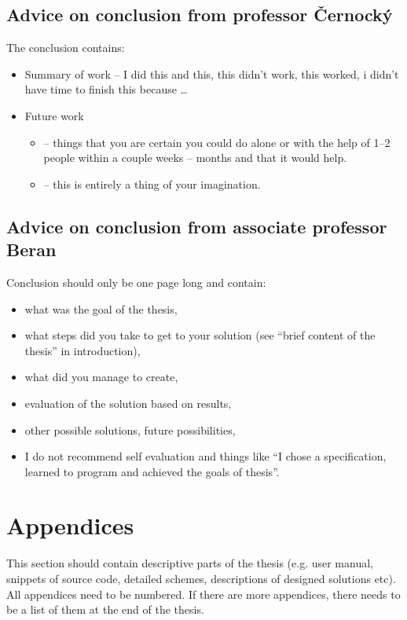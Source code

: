 \subsection{Advice on conclusion from professor Černocký}

The conclusion contains:
\begin{itemize}
  \item{Summary of work -- I did this and this, this didn't work, this worked, i didn't have time to finish this because \ldots}
  \item{Future work
    \begin{itemize}
      \item{ -- things that you are certain you could do alone or with the help of 1--2 people within a couple weeks -- months and that it would help.}
      \item{ -- this is entirely a thing of your imagination.}
    \end{itemize}}
\end{itemize}

\subsection*{Advice on conclusion from associate professor Beran}
Conclusion should only be one page long and contain:
    \begin{itemize}
      \item{what was the goal of the thesis,}
      \item{what steps did you take to get to your solution (see ``brief content of the thesis'' in introduction),}
      \item{what did you manage to create,}
      \item{evaluation of the solution based on results,}
      \item{other possible solutions, future possibilities,}
      \item{I do not recommend self evaluation and things like ``I chose a specification, learned to program and achieved the goals of thesis''.}
    \end{itemize}

\section{Appendices}

This section should contain descriptive parts of the thesis (e.g. user manual, snippets of source code, detailed schemes, descriptions of designed solutions etc). All appendices need to be numbered. If there are more appendices, there needs to be a list of them at the end of the thesis. \cite{fitWeb}

